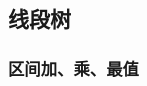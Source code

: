 \documentclass[a4paper, twoside]{article}
\begin{document}
\subsection{线段树}
    \subsubsection{区间加、乘、最值}
    \inputminted{cpp}{../src/数据结构/线段树（区间加、乘、最值）.cpp}









\end{document}
